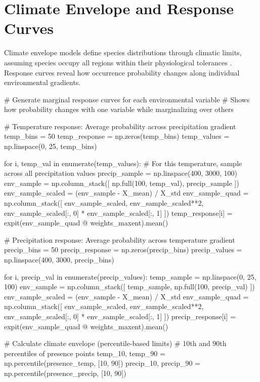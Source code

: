 \documentclass[11pt,a4paper]{article}
\begin{document}
\section{Climate Envelope and Response Curves}

Climate envelope models define species distributions through climatic limits, assuming species occupy all regions within their physiological tolerances \cite{booth2014bioclim}. Response curves reveal how occurrence probability changes along individual environmental gradients.

\begin{pycode}
# Generate marginal response curves for each environmental variable
# Shows how probability changes with one variable while marginalizing over others

# Temperature response: Average probability across precipitation gradient
temp_bins = 50
temp_response = np.zeros(temp_bins)
temp_values = np.linspace(0, 25, temp_bins)

for i, temp_val in enumerate(temp_values):
    # For this temperature, sample across all precipitation values
    precip_sample = np.linspace(400, 3000, 100)
    env_sample = np.column_stack([
        np.full(100, temp_val),
        precip_sample
    ])
    env_sample_scaled = (env_sample - X_mean) / X_std
    env_sample_quad = np.column_stack([
        env_sample_scaled,
        env_sample_scaled**2,
        env_sample_scaled[:, 0] * env_sample_scaled[:, 1]
    ])
    temp_response[i] = expit(env_sample_quad @ weights_maxent).mean()

# Precipitation response: Average probability across temperature gradient
precip_bins = 50
precip_response = np.zeros(precip_bins)
precip_values = np.linspace(400, 3000, precip_bins)

for i, precip_val in enumerate(precip_values):
    temp_sample = np.linspace(0, 25, 100)
    env_sample = np.column_stack([
        temp_sample,
        np.full(100, precip_val)
    ])
    env_sample_scaled = (env_sample - X_mean) / X_std
    env_sample_quad = np.column_stack([
        env_sample_scaled,
        env_sample_scaled**2,
        env_sample_scaled[:, 0] * env_sample_scaled[:, 1]
    ])
    precip_response[i] = expit(env_sample_quad @ weights_maxent).mean()

# Calculate climate envelope (percentile-based limits)
# 10th and 90th percentiles of presence points
temp_10, temp_90 = np.percentile(presence_temp, [10, 90])
precip_10, precip_90 = np.percentile(presence_precip, [10, 90])


\end{pycode}
\end{document}
